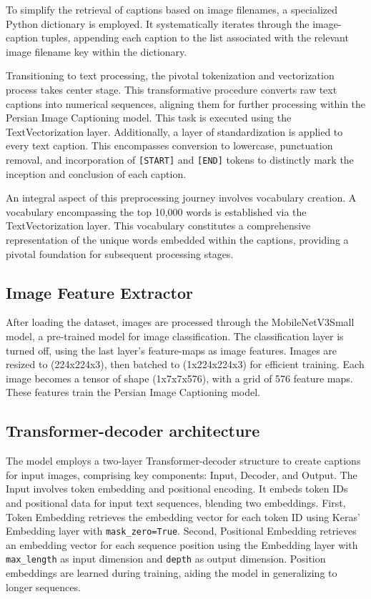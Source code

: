 \documentclass[runningheads]{llncs}
\begin{document}
To simplify the retrieval of captions based on image filenames, a specialized Python dictionary is employed. It systematically iterates through the image-caption tuples, appending each caption to the list associated with the relevant image filename key within the dictionary.

Transitioning to text processing, the pivotal tokenization and vectorization process takes center stage. This transformative procedure converts raw text captions into numerical sequences, aligning them for further processing within the Persian Image Captioning model. This task is executed using the TextVectorization layer. Additionally, a layer of standardization is applied to every text caption. This encompasses conversion to lowercase, punctuation removal, and incorporation of \texttt{[START]} and \texttt{[END]} tokens to distinctly mark the inception and conclusion of each caption.

An integral aspect of this preprocessing journey involves vocabulary creation. A vocabulary encompassing the top 10,000 words is established via the TextVectorization layer. This vocabulary constitutes a comprehensive representation of the unique words embedded within the captions, providing a pivotal foundation for subsequent processing stages.

\subsection{Image Feature Extractor}

After loading the dataset, images are processed through the MobileNetV3Small model, a pre-trained model for image classification. The classification layer is turned off, using the last layer's feature-maps as image features. Images are resized to (224x224x3), then batched to (1x224x224x3) for efficient training. Each image becomes a tensor of shape (1x7x7x576), with a grid of 576 feature maps. These features train the Persian Image Captioning model.

\subsection{Transformer-decoder architecture}

The model employs a two-layer Transformer-decoder structure to create captions for input images, comprising key components: Input, Decoder, and Output. The Input involves token embedding and positional encoding. It embeds token IDs and positional data for input text sequences, blending two embeddings. First, Token Embedding retrieves the embedding vector for each token ID using Keras' Embedding layer with \texttt{mask\_zero=True}. Second, Positional Embedding retrieves an embedding vector for each sequence position using the Embedding layer with \texttt{max\_length} as input dimension and \texttt{depth} as output dimension. Position embeddings are learned during training, aiding the model in generalizing to longer sequences.
\end{document}
